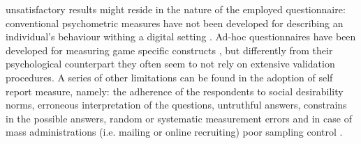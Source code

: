 unsatisfactory results might reside in the nature of the employed questionnaire: conventional psychometric measures have not been developed for describing an individual's behaviour withing a digital setting \cite{yannakakis2013player}. Ad-hoc questionnaires have been developed for measuring game specific constructs \cite{yee2006motivations,tondello2016gamification}, but differently from their psychological counterpart they often seem to not rely on extensive validation procedures. A series of other limitations can be found in the adoption of self report measure, namely: the adherence of the respondents to social desirability norms, erroneous interpretation of the questions, untruthful answers, constrains in the possible answers, random or systematic measurement errors and in case of mass administrations (i.e. mailing or online recruiting) poor sampling control \cite{van2009psychologically}.

